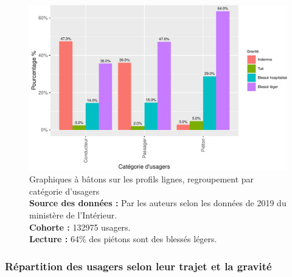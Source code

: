 \documentclass[french,]{tp}
\begin{document}
\begin{figure}[ht!]

{\centering \includegraphics{Prediction_Gravite_files/figure-latex/barplot1-1} 

}

\caption{Graphiques à bâtons sur les profils lignes, regroupement par catégorie d'usagers\\
\textbf{Source des données :} Par les auteurs selon les données de 2019 du ministère de l'Intérieur.\\
\textbf{Cohorte :} 132975 usagers.\\
\textbf{Lecture :} 64\% des piétons sont des blessés légers.}\label{fig:barplot1}
\end{figure}

\newpage

\hypertarget{ruxe9partition-des-usagers-selon-leur-trajet-et-la-gravituxe9}{%
\subsubsection{Répartition des usagers selon leur trajet et la gravité}\label{ruxe9partition-des-usagers-selon-leur-trajet-et-la-gravituxe9}}
\end{document}

